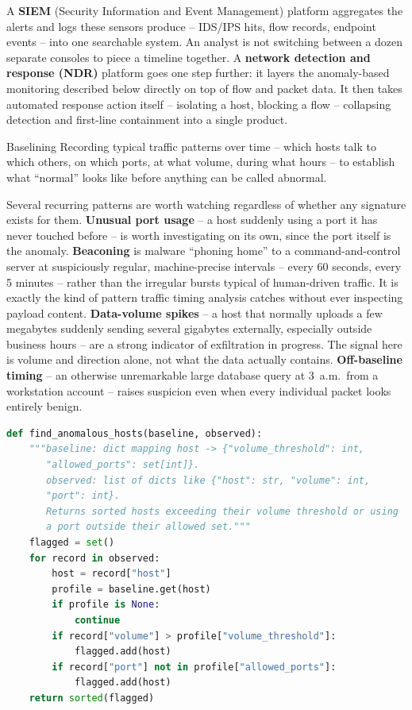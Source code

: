 A \textbf{SIEM} (Security Information and Event Management) platform aggregates the alerts and logs
these sensors produce -- IDS/IPS hits, flow records, endpoint events -- into one searchable system.
An analyst is not switching between a dozen separate consoles to piece a timeline together. A
\textbf{network detection and response (NDR)} platform goes one step further: it layers the
anomaly-based monitoring described below directly on top of flow and packet data. It then takes
automated response action itself -- isolating a host, blocking a flow -- collapsing detection and
first-line containment into a single product.

\begin{definition}{Baselining}
Recording typical traffic patterns over time -- which hosts talk to which others, on which ports,
at what volume, during what hours -- to establish what ``normal'' looks like before anything can be
called abnormal.
\end{definition}

Several recurring patterns are worth watching regardless of whether any signature exists for them.
\textbf{Unusual port usage} -- a host suddenly using a port it has never touched before -- is worth
investigating on its own, since the port itself is the anomaly. \textbf{Beaconing} is malware
``phoning home'' to a command-and-control server at suspiciously regular, machine-precise intervals
-- every 60 seconds, every 5 minutes -- rather than the irregular bursts typical of human-driven
traffic. It is exactly the kind of pattern traffic timing analysis catches without ever
inspecting payload content. \textbf{Data-volume spikes} -- a host that normally uploads a few
megabytes suddenly sending several gigabytes externally, especially outside business hours -- are a
strong indicator of exfiltration in progress. The signal here is volume and direction alone, not
what the data actually contains. \textbf{Off-baseline timing} -- an otherwise unremarkable large
database query at 3~a.m.\ from a workstation account -- raises suspicion even when every individual
packet looks entirely benign.

\begin{lstlisting}[language=Python, caption={Flagging hosts that deviate from a per-host traffic baseline}]
def find_anomalous_hosts(baseline, observed):
    """baseline: dict mapping host -> {"volume_threshold": int,
       "allowed_ports": set[int]}.
       observed: list of dicts like {"host": str, "volume": int,
       "port": int}.
       Returns sorted hosts exceeding their volume threshold or using
       a port outside their allowed set."""
    flagged = set()
    for record in observed:
        host = record["host"]
        profile = baseline.get(host)
        if profile is None:
            continue
        if record["volume"] > profile["volume_threshold"]:
            flagged.add(host)
        if record["port"] not in profile["allowed_ports"]:
            flagged.add(host)
    return sorted(flagged)
\end{lstlisting}

